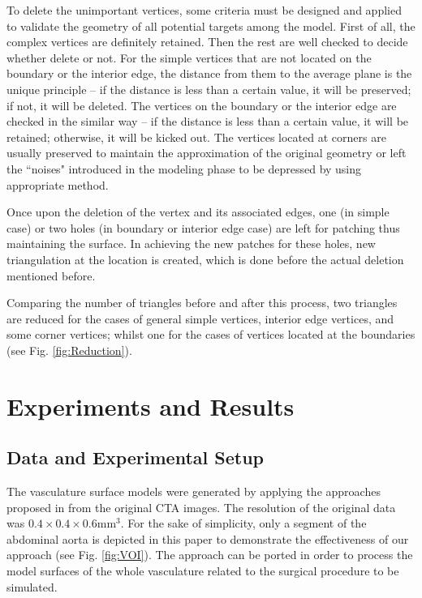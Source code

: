 To delete the unimportant vertices, some criteria must be designed and applied to validate the geometry of all potential targets among the model.
First of all, the complex vertices are definitely retained.
Then the rest are well checked to decide whether delete or not.
For the simple vertices that are not located on the boundary or the interior edge, the distance from them to the average plane is the unique principle -- if the distance is less than a certain value, it will be preserved; if not, it will be deleted. %
The vertices on the boundary or the interior edge are checked in the similar way -- if the distance is less than a certain value, it will be retained; otherwise, it will be kicked out. %
The vertices located at corners are usually preserved to maintain the approximation of the original geometry or left the ``noises" introduced in the modeling phase to be depressed by using appropriate method. %

Once upon the deletion of the vertex and its associated edges, one (in simple case) or two holes (in boundary or interior edge case) are left for patching thus maintaining the surface. In achieving the new patches for these holes, new triangulation at the location is created, which is done before the actual deletion mentioned before.

Comparing the number of triangles before and after this process, two triangles are reduced for the cases of general simple vertices, interior edge vertices, and some corner vertices; whilst one for the cases of vertices located at the boundaries (see Fig. \ref{fig:Reduction}). %

\section{Experiments and Results}

\subsection{Data and Experimental Setup}

The vasculature surface models were generated by applying the approaches proposed in \cite{Yang2014ICRA} from the original CTA images.
The resolution of the original data was $0.4 \times 0.4 \times 0.6 \text{mm}^3$.
For the sake of simplicity, only a segment of the abdominal aorta is depicted in this paper to demonstrate the effectiveness of our approach (see Fig. \ref{fig:VOI}).
The approach can be ported in order to process the model surfaces of the whole vasculature related to the surgical procedure to be simulated.

